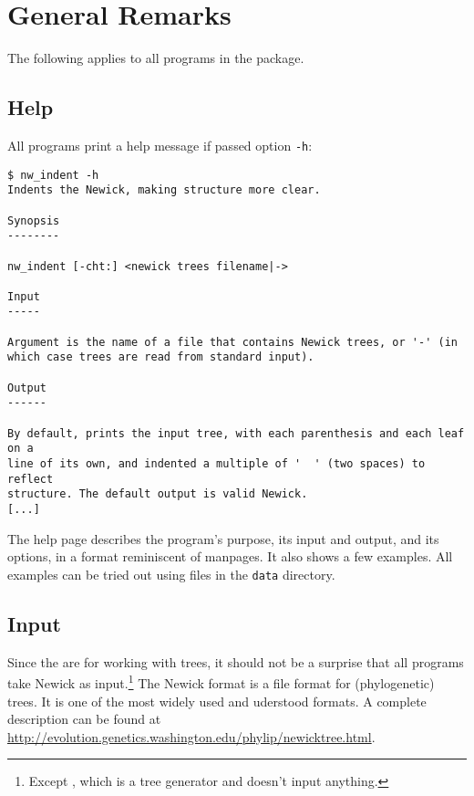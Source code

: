 
\chapter{General Remarks}
\label{chap_general}

The following applies to all programs in the \nutils{} package.

\section{Help}
\label{sct_help}

All programs print a help message if passed option \texttt{-h}:

\begin{samepage}
\begin{verbatim}
$ nw_indent -h
Indents the Newick, making structure more clear.

Synopsis
--------

nw_indent [-cht:] <newick trees filename|->

Input
-----

Argument is the name of a file that contains Newick trees, or '-' (in
which case trees are read from standard input).

Output
------

By default, prints the input tree, with each parenthesis and each leaf on a
line of its own, and indented a multiple of '  ' (two spaces) to reflect
structure. The default output is valid Newick.
[...]
\end{verbatim}
\end{samepage}
The help page describes the program's purpose, its input and output, and its options, in a format reminiscent of \unix{} manpages. It also shows a few examples. All examples can be tried out using files in the \texttt{data} directory.

\section{Input}
\label{sct_input}

Since the \nutils{} are for working with trees, it should not be a surprise
that all programs take Newick as input.\footnote{Except \gen{}, which is a tree generator and doesn't input anything.} The Newick format is a file format for
(phylogenetic) trees. It is one of the most widely used and uderstood formats.
A complete description can be found at
\url{http://evolution.genetics.washington.edu/phylip/newicktree.html}.

